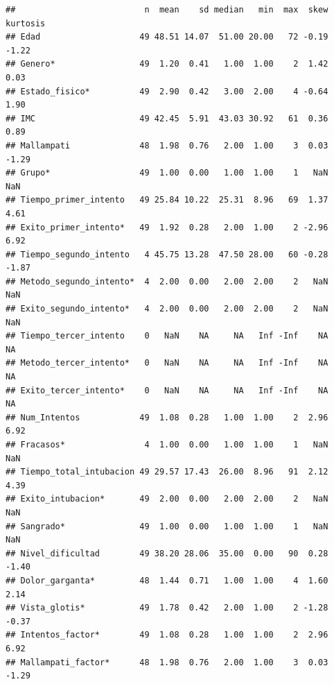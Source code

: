 \documentclass[
]{article}
\newenvironment{Shaded}{\begin{snugshade}}{\end{snugshade}}
\newcommand{\CommentTok}[1]{\textcolor[rgb]{0.56,0.35,0.01}{\textit{#1}}}
\newcommand{\DecValTok}[1]{\textcolor[rgb]{0.00,0.00,0.81}{#1}}
\newcommand{\FunctionTok}[1]{\textcolor[rgb]{0.13,0.29,0.53}{\textbf{#1}}}
\newcommand{\NormalTok}[1]{#1}
\newcommand{\SpecialCharTok}[1]{\textcolor[rgb]{0.81,0.36,0.00}{\textbf{#1}}}
\begin{document}
\begin{verbatim}
##                          n  mean    sd median   min  max  skew kurtosis
## Edad                    49 48.51 14.07  51.00 20.00   72 -0.19    -1.22
## Genero*                 49  1.20  0.41   1.00  1.00    2  1.42     0.03
## Estado_fisico*          49  2.90  0.42   3.00  2.00    4 -0.64     1.90
## IMC                     49 42.45  5.91  43.03 30.92   61  0.36     0.89
## Mallampati              48  1.98  0.76   2.00  1.00    3  0.03    -1.29
## Grupo*                  49  1.00  0.00   1.00  1.00    1   NaN      NaN
## Tiempo_primer_intento   49 25.84 10.22  25.31  8.96   69  1.37     4.61
## Exito_primer_intento*   49  1.92  0.28   2.00  1.00    2 -2.96     6.92
## Tiempo_segundo_intento   4 45.75 13.28  47.50 28.00   60 -0.28    -1.87
## Metodo_segundo_intento*  4  2.00  0.00   2.00  2.00    2   NaN      NaN
## Exito_segundo_intento*   4  2.00  0.00   2.00  2.00    2   NaN      NaN
## Tiempo_tercer_intento    0   NaN    NA     NA   Inf -Inf    NA       NA
## Metodo_tercer_intento*   0   NaN    NA     NA   Inf -Inf    NA       NA
## Exito_tercer_intento*    0   NaN    NA     NA   Inf -Inf    NA       NA
## Num_Intentos            49  1.08  0.28   1.00  1.00    2  2.96     6.92
## Fracasos*                4  1.00  0.00   1.00  1.00    1   NaN      NaN
## Tiempo_total_intubacion 49 29.57 17.43  26.00  8.96   91  2.12     4.39
## Exito_intubacion*       49  2.00  0.00   2.00  2.00    2   NaN      NaN
## Sangrado*               49  1.00  0.00   1.00  1.00    1   NaN      NaN
## Nivel_dificultad        49 38.20 28.06  35.00  0.00   90  0.28    -1.40
## Dolor_garganta*         48  1.44  0.71   1.00  1.00    4  1.60     2.14
## Vista_glotis*           49  1.78  0.42   2.00  1.00    2 -1.28    -0.37
## Intentos_factor*        49  1.08  0.28   1.00  1.00    2  2.96     6.92
## Mallampati_factor*      48  1.98  0.76   2.00  1.00    3  0.03    -1.29
\end{verbatim}

\begin{Shaded}
\end{Shaded}
\end{document}
